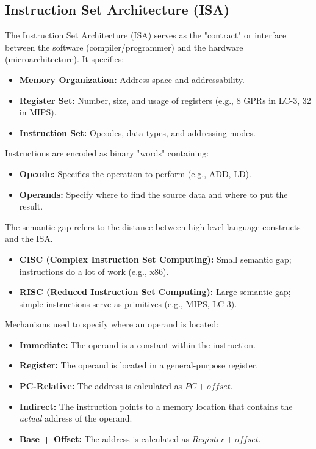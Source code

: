 \subsection{Instruction Set Architecture (ISA)}

\begin{definition}
	The Instruction Set Architecture (ISA) serves as the "contract" or interface between the software (compiler/programmer) and the hardware (microarchitecture). It specifies:
	\begin{itemize}
		\item \textbf{Memory Organization:} Address space and addressability.
		\item \textbf{Register Set:} Number, size, and usage of registers (e.g., 8 GPRs in LC-3, 32 in MIPS).
		\item \textbf{Instruction Set:} Opcodes, data types, and addressing modes.
	\end{itemize}
\end{definition}

\begin{important}
	Instructions are encoded as binary "words" containing:
	\begin{itemize}
		\item \textbf{Opcode:} Specifies the operation to perform (e.g., ADD, LD).
		\item \textbf{Operands:} Specify where to find the source data and where to put the result.
	\end{itemize}
\end{important}

\begin{lemma}
	The semantic gap refers to the distance between high-level language constructs and the ISA.
	\begin{itemize}
		\item \textbf{CISC (Complex Instruction Set Computing):} Small semantic gap; instructions do a lot of work (e.g., x86).
		\item \textbf{RISC (Reduced Instruction Set Computing):} Large semantic gap; simple instructions serve as primitives (e.g., MIPS, LC-3).
	\end{itemize}
\end{lemma}

\begin{definition}
	Mechanisms used to specify where an operand is located:
	\begin{itemize}
		\item \textbf{Immediate:} The operand is a constant within the instruction.
		\item \textbf{Register:} The operand is located in a general-purpose register.
		\item \textbf{PC-Relative:} The address is calculated as $PC + offset$.
		\item \textbf{Indirect:} The instruction points to a memory location that contains the \textit{actual} address of the operand.
		\item \textbf{Base + Offset:} The address is calculated as $Register + offset$.
	\end{itemize}
\end{definition}

